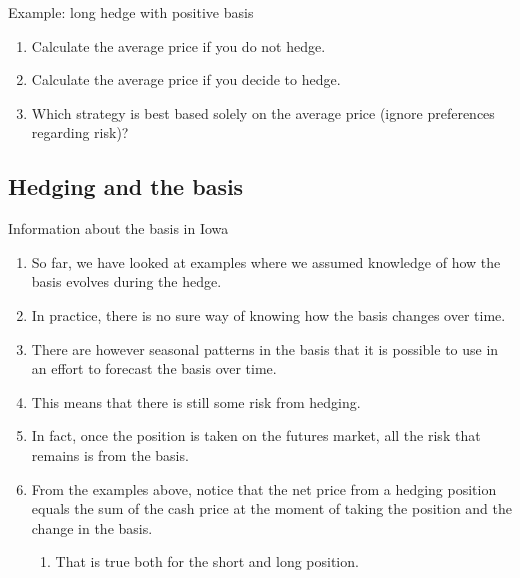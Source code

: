 \documentclass[table,xcolor=pdftex,dvipsnames]{beamer}\usepackage[]{graphicx}\usepackage[]{color}
\begin{document}
\begin{frame}{Example: long hedge with positive basis}
\begin{enumerate}[label=\textbullet]
  \item Calculate the average price if you do not hedge.
  \bigskip \bigskip
  \item Calculate the average price if you decide to hedge.
  \bigskip \bigskip
  \item Which strategy is best based solely on the average price (ignore preferences regarding risk)?
\end{enumerate}
\end{frame}

\subsection{Hedging and the basis}

\begin{frame}{Information about the basis in Iowa}
\begin{enumerate}[label=\textbullet]
  \item So far, we have looked at examples where we assumed knowledge of how the basis evolves during the hedge.
  \item In practice, there is no sure way of knowing how the basis changes over time.
  \item There are however seasonal patterns in the basis that it is possible to use in an effort to forecast the basis over time.
  \item This means that there is still some risk from hedging.
  \item In fact, once the position is taken on the futures market, all the risk that remains is from the basis.
  \item From the examples above, notice that the net price from a hedging position equals the sum of the cash price at the moment of taking the position and the change in the basis.
      \begin{enumerate}[label=-]
            \item That is true both for the short and long position.
      \end{enumerate}
\end{enumerate}
\end{frame}

\end{document}
